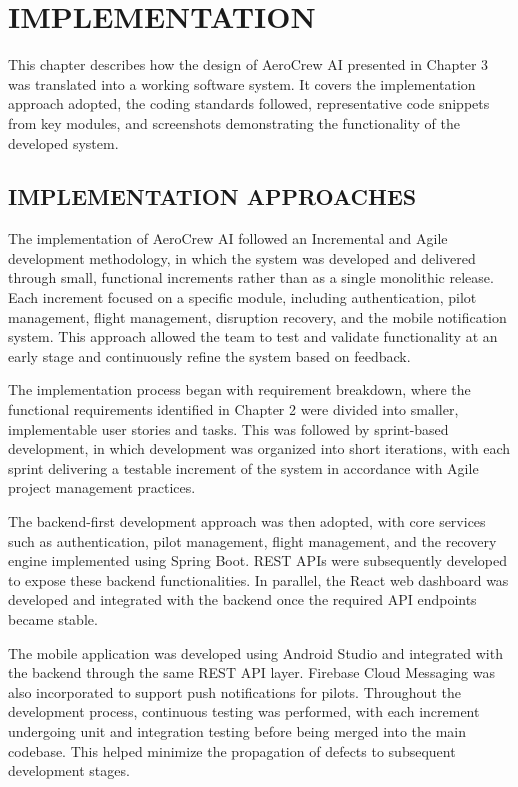 \documentclass[12pt,a4paper]{report}
\begin{document}
\chapter{IMPLEMENTATION}

This chapter describes how the design of AeroCrew AI presented in Chapter 3 was translated into a working software system. It covers the implementation approach adopted, the coding standards followed, representative code snippets from key modules, and screenshots demonstrating the functionality of the developed system.

\section{IMPLEMENTATION APPROACHES}

The implementation of AeroCrew AI followed an Incremental and Agile development methodology, in which the system was developed and delivered through small, functional increments rather than as a single monolithic release. Each increment focused on a specific module, including authentication, pilot management, flight management, disruption recovery, and the mobile notification system. This approach allowed the team to test and validate functionality at an early stage and continuously refine the system based on feedback.

The implementation process began with requirement breakdown, where the functional requirements identified in Chapter 2 were divided into smaller, implementable user stories and tasks. This was followed by sprint-based development, in which development was organized into short iterations, with each sprint delivering a testable increment of the system in accordance with Agile project management practices.

The backend-first development approach was then adopted, with core services such as authentication, pilot management, flight management, and the recovery engine implemented using Spring Boot. REST APIs were subsequently developed to expose these backend functionalities. In parallel, the React web dashboard was developed and integrated with the backend once the required API endpoints became stable.

The mobile application was developed using Android Studio and integrated with the backend through the same REST API layer. Firebase Cloud Messaging was also incorporated to support push notifications for pilots. Throughout the development process, continuous testing was performed, with each increment undergoing unit and integration testing before being merged into the main codebase. This helped minimize the propagation of defects to subsequent development stages.
\end{document}
